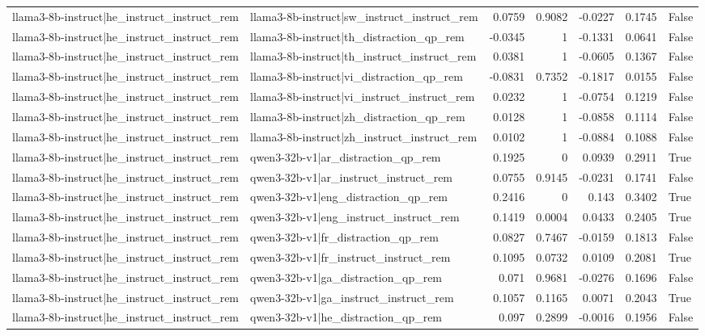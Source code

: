 \begin{table}
\begin{tabular}{l l r r r r l}
llama3-8b-instruct|he_instruct_instruct_rem & llama3-8b-instruct|sw_instruct_instruct_rem & 0.0759 & 0.9082 & -0.0227 & 0.1745 & False \\
llama3-8b-instruct|he_instruct_instruct_rem & llama3-8b-instruct|th_distraction_qp_rem & -0.0345 & 1 & -0.1331 & 0.0641 & False \\
llama3-8b-instruct|he_instruct_instruct_rem & llama3-8b-instruct|th_instruct_instruct_rem & 0.0381 & 1 & -0.0605 & 0.1367 & False \\
llama3-8b-instruct|he_instruct_instruct_rem & llama3-8b-instruct|vi_distraction_qp_rem & -0.0831 & 0.7352 & -0.1817 & 0.0155 & False \\
llama3-8b-instruct|he_instruct_instruct_rem & llama3-8b-instruct|vi_instruct_instruct_rem & 0.0232 & 1 & -0.0754 & 0.1219 & False \\
llama3-8b-instruct|he_instruct_instruct_rem & llama3-8b-instruct|zh_distraction_qp_rem & 0.0128 & 1 & -0.0858 & 0.1114 & False \\
llama3-8b-instruct|he_instruct_instruct_rem & llama3-8b-instruct|zh_instruct_instruct_rem & 0.0102 & 1 & -0.0884 & 0.1088 & False \\
llama3-8b-instruct|he_instruct_instruct_rem & qwen3-32b-v1|ar_distraction_qp_rem & 0.1925 & 0 & 0.0939 & 0.2911 & True \\
llama3-8b-instruct|he_instruct_instruct_rem & qwen3-32b-v1|ar_instruct_instruct_rem & 0.0755 & 0.9145 & -0.0231 & 0.1741 & False \\
llama3-8b-instruct|he_instruct_instruct_rem & qwen3-32b-v1|eng_distraction_qp_rem & 0.2416 & 0 & 0.143 & 0.3402 & True \\
llama3-8b-instruct|he_instruct_instruct_rem & qwen3-32b-v1|eng_instruct_instruct_rem & 0.1419 & 0.0004 & 0.0433 & 0.2405 & True \\
llama3-8b-instruct|he_instruct_instruct_rem & qwen3-32b-v1|fr_distraction_qp_rem & 0.0827 & 0.7467 & -0.0159 & 0.1813 & False \\
llama3-8b-instruct|he_instruct_instruct_rem & qwen3-32b-v1|fr_instruct_instruct_rem & 0.1095 & 0.0732 & 0.0109 & 0.2081 & True \\
llama3-8b-instruct|he_instruct_instruct_rem & qwen3-32b-v1|ga_distraction_qp_rem & 0.071 & 0.9681 & -0.0276 & 0.1696 & False \\
llama3-8b-instruct|he_instruct_instruct_rem & qwen3-32b-v1|ga_instruct_instruct_rem & 0.1057 & 0.1165 & 0.0071 & 0.2043 & True \\
llama3-8b-instruct|he_instruct_instruct_rem & qwen3-32b-v1|he_distraction_qp_rem & 0.097 & 0.2899 & -0.0016 & 0.1956 & False \\

\end{tabular}
\end{table}
